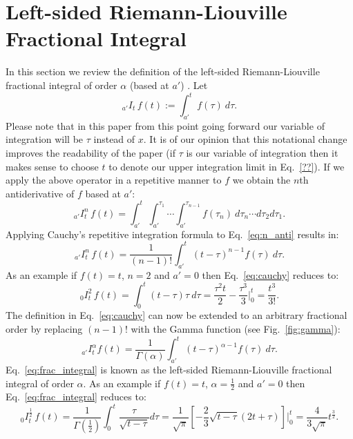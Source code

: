 \documentclass[twoside,reqno,11pt]{fcaa-var} %
\begin{document}
\section{Left-sided Riemann-Liouville Fractional Integral}
In this section we review the definition of the left-sided Riemann-Liouville fractional integral of order $\alpha$ (based at $a'$) \cite{laurent1884}. Let
\begin{equation}
_{a'}I_t\, f(t) := \int_{a'}^t f(\tau)~d\tau.
\end{equation}
Please note that in this paper from this point going forward our variable of integration will be $\tau$ instead of $x$. It is of our opinion that this notational change improves the readability of the paper (if $\tau$ is our variable of integration then it makes sense to choose $t$ to denote our upper integration limit in Eq.~\ref{??}). 
If we apply the above operator in a repetitive manner to $f$ we obtain the $n$th antiderivative of $f$ based at $a'$:
\begin{equation}
\label{eq:n_anti}
_{a'}I_t^n\,f(t) = \int_{a'}^t\int_{a'}^{\tau_1}\cdots \int_{a'}^{\tau_{n-1}}f(\tau_n)~d\tau_n\cdots d\tau_2 d\tau_1.
\end{equation}
Applying Cauchy's repetitive integration formula to Eq.~\eqref{eq:n_anti} results in:
\begin{equation}
\label{eq:cauchy}
_{a'}I_t^n\,f(t) = \frac{1}{(n-1)!}\int_{a'}^t (t-\tau)^{n-1}f(\tau)~d\tau.
\end{equation}
As an example if $f(t)=t$, $n=2$ and $a'=0$ then Eq.~\eqref{eq:cauchy} reduces to:
\begin{equation}
_{0}I_t^2\,f(t) = \int_0^t (t-\tau)\tau~d\tau = \frac{\tau^2 t}{2} - \frac{\tau^3}{3} \Bigg |_0^t = \frac{t^3}{3!}.
\end{equation}
The definition in Eq.~\eqref{eq:cauchy} can now be extended to an arbitrary fractional order by replacing $(n-1)!$ with the Gamma function (see Fig.~\ref{fig:gamma}):
\begin{equation}
\label{eq:frac_integral}
_{a'}I_t^{\alpha}f(t) = \frac{1}{\Gamma(\alpha)}\int_{a'}^t (t-\tau)^{\alpha-1}f(\tau)~d\tau.
\end{equation}
Eq.~\eqref{eq:frac_integral} is known as the left-sided Riemann-Liouville fractional integral of order $\alpha$. As an example if $f(t)=t$, $\alpha=\frac{1}{2}$ and $a'=0$ then 
Eq.~\eqref{eq:frac_integral} reduces to:
\begin{equation}
_0 I_t^{\frac{1}{2}}\,f(t) = \frac{1}{\Gamma(\frac{1}{2})} \int_0^t \frac{\tau}{\sqrt{t-\tau}} d\tau = \frac{1}{\sqrt{\pi}}\left [ -\frac{2}{3}\sqrt{t-\tau}(2t+\tau)\right] \Bigg |_0^t=\frac{4}{3\sqrt{\pi}}t^{\frac{3}{2}}. 
\end{equation}
\end{document}
